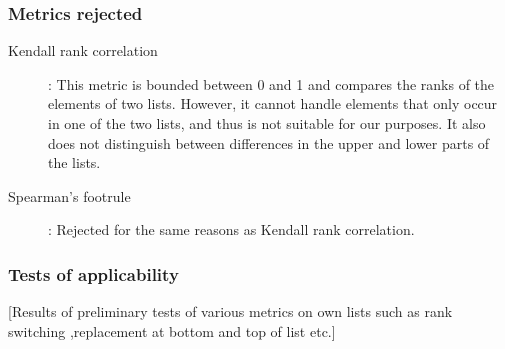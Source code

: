 \subsubsection{Metrics rejected}
\begin{description}
	\item [Kendall rank correlation ] \cite{kendallNEWMEASURERANK1938b}: This metric is bounded between 0 and 1 and compares the ranks of the elements of two lists. However, it cannot handle elements that only occur in one of the two lists, and thus is not suitable for our purposes. It also does not distinguish between differences in the upper and lower parts of the lists.
	\item [Spearman's footrule] \cite{spearmanCorrelationCalculatedFaulty1910}: Rejected for the same reasons as Kendall rank correlation.
\end{description}


\subsubsection{Tests of applicability}
[Results of preliminary tests of various metrics on own lists such as rank switching ,replacement at bottom and top of list etc.]

